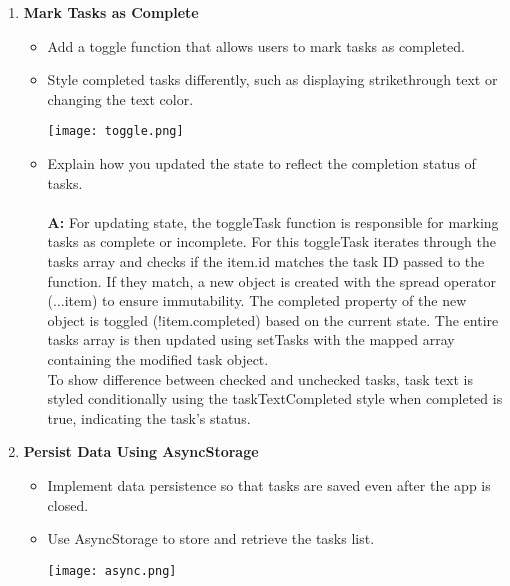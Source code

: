 \documentclass{article}
\begin{document}
        \begin{enumerate}
            \item \textbf{Mark Tasks as Complete }
                \begin{itemize}
                    \item Add a toggle function that allows users to mark tasks as completed.
                    \item Style completed tasks differently, such as displaying strikethrough text or changing the text color.
                    \begin{center}
                    \texttt{[image: toggle.png]}\\
                    \end{center}
                    
                    \item Explain how you updated the state to reflect the completion status of tasks.\\
                    \\
                    \textbf{A:} For updating state, the toggleTask function is responsible for marking tasks as complete or incomplete. For this toggleTask iterates through the tasks array and checks if the item.id matches the task ID passed to the function. If they match, a new object is created with the spread operator (...item) to ensure immutability. The completed property of the new object is toggled (!item.completed) based on the current state. The entire tasks array is then updated using setTasks with the mapped array containing the modified task object.\\ 
        To show difference between checked and unchecked tasks, task text is styled conditionally using the taskTextCompleted style when completed is true, indicating the task's status.
                \end{itemize}
            \item \textbf{Persist Data Using AsyncStorage }
                \begin{itemize}
                    \item Implement data persistence so that tasks are saved even after the app is closed.
                    \item Use AsyncStorage to store and retrieve the tasks list.
                     \begin{center}
                    \texttt{[image: async.png]}\\
                    \end{center}


\end{itemize}
\end{enumerate}
\end{document}
